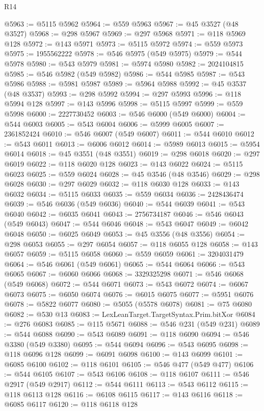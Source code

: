 \begin{lexlean}{R14}
\begin{coremodule}
@5963 := @5115 @5962
@5964 := @559 @5963
@5967 := @45 @3527 (@48 @3527)
@5968 := @298 @5967
@5969 := @297 @5968
@5971 := @118 @5969 @128
@5972 := @143 @5971
@5973 := @5115 @5972
@5974 := @559 @5973
@5975 := 1955562222
@5978 := @546 @5975 (@549 @5975)
@5979 := @544 @5978
@5980 := @543 @5979
@5981 := @5974 @5980
@5982 := 2024104815
@5985 := @546 @5982 (@549 @5982)
@5986 := @544 @5985
@5987 := @543 @5986
@5988 := @5981 @5987
@5989 := @5964 @5988
@5992 := @45 @3537 (@48 @3537)
@5993 := @298 @5992
@5994 := @297 @5993
@5996 := @118 @5994 @128
@5997 := @143 @5996
@5998 := @5115 @5997
@5999 := @559 @5998
@6000 := 2227730452
@6003 := @546 @6000 (@549 @6000)
@6004 := @544 @6003
@6005 := @543 @6004
@6006 := @5999 @6005
@6007 := 2361852424
@6010 := @546 @6007 (@549 @6007)
@6011 := @544 @6010
@6012 := @543 @6011
@6013 := @6006 @6012
@6014 := @5989 @6013
@6015 := @5954 @6014
@6018 := @45 @3551 (@48 @3551)
@6019 := @298 @6018
@6020 := @297 @6019
@6022 := @118 @6020 @128
@6023 := @143 @6022
@6024 := @5115 @6023
@6025 := @559 @6024
@6028 := @45 @3546 (@48 @3546)
@6029 := @298 @6028
@6030 := @297 @6029
@6032 := @118 @6030 @128
@6033 := @143 @6032
@6034 := @5115 @6033
@6035 := @559 @6034
@6036 := 2428436474
@6039 := @546 @6036 (@549 @6036)
@6040 := @544 @6039
@6041 := @543 @6040
@6042 := @6035 @6041
@6043 := 2756734187
@6046 := @546 @6043 (@549 @6043)
@6047 := @544 @6046
@6048 := @543 @6047
@6049 := @6042 @6048
@6050 := @6025 @6049
@6053 := @45 @3556 (@48 @3556)
@6054 := @298 @6053
@6055 := @297 @6054
@6057 := @118 @6055 @128
@6058 := @143 @6057
@6059 := @5115 @6058
@6060 := @559 @6059
@6061 := 3204031479
@6064 := @546 @6061 (@549 @6061)
@6065 := @544 @6064
@6066 := @543 @6065
@6067 := @6060 @6066
@6068 := 3329325298
@6071 := @546 @6068 (@549 @6068)
@6072 := @544 @6071
@6073 := @543 @6072
@6074 := @6067 @6073
@6075 := @6050 @6074
@6076 := @6015 @6075
@6077 := @5951 @6076
@6078 := @5822 @6077
@6080 := @5055 (@5578 @6078)
@6081 := @75 @6080
@6082 := @530 @13
@6083 := LexLeanTarget.TargetSyntax.Prim.bitXor
@6084 := @276 @6083
@6085 := @115 @5671
@6088 := @546 @231 (@549 @231)
@6089 := @544 @6088
@6090 := @543 @6089
@6091 := @118 @6090
@6094 := @546 @3380 (@549 @3380)
@6095 := @544 @6094
@6096 := @543 @6095
@6098 := @118 @6096 @128
@6099 := @6091 @6098
@6100 := @143 @6099
@6101 := @6085 @6100
@6102 := @118 @6101
@6105 := @546 @477 (@549 @477)
@6106 := @544 @6105
@6107 := @543 @6106
@6108 := @118 @6107
@6111 := @546 @2917 (@549 @2917)
@6112 := @544 @6111
@6113 := @543 @6112
@6115 := @118 @6113 @128
@6116 := @6108 @6115
@6117 := @143 @6116
@6118 := @6085 @6117
@6120 := @118 @6118 @128

\end{coremodule}
\end{lexlean}
